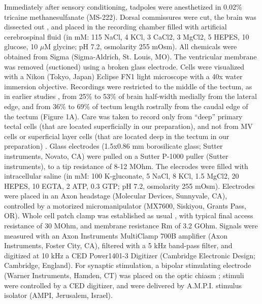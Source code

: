 \documentclass{article}
\begin{document}
Immediately after sensory conditioning, tadpoles were anesthetized in 0.02\% tricaine methanesulfanate (MS-222). Dorsal commissures were cut, the brain was dissected out \citep{aizenman2003,ciarleglio2015}, and placed in the recording chamber filled with artificial cerebrospinal fluid (in mM: 115 NaCl, 4 KCl, 3 CaCl2, 3 MgCl2, 5 HEPES, 10 glucose, 10 $\mu$M glycine; pH 7.2, osmolarity 255 mOsm). All chemicals were obtained from Sigma (Sigma-Aldrich, St. Louis, MO). The ventricular membrane was removed (suctioned) using a broken glass electrode. Cells were visualized with a Nikon (Tokyo, Japan) Eclipse FN1 light microscope with a 40x water immersion objective. Recordings were restricted to the middle of the tectum, as in earlier studies \citep{ciarleglio2015}, from 25\% to 53\% of brain half-width medially from the lateral edge, and from 36\% to 69\% of tectum length rostrally from the caudal edge of the tectum (Figure 1A). Care was taken to record only from “deep” primary tectal cells (that are located superficially in our preparation), and not from MV cells \citep{pratt2009trigeminal} or superficial layer cells (that are located deep in the tectum in our preparation) \citep{liu2016}. Glass electrodes (1.5x0.86 mm borosilicate glass; Sutter instruments, Novato, CA) were pulled on a Sutter P-1000 puller (Sutter instruments), to a tip resistance of 8-12 MOhm. The elecrodes were filled with intracellular saline (in mM: 100 K-gluconate, 5 NaCl, 8 KCl, 1.5 MgCl2, 20 HEPES, 10 EGTA, 2 ATP, 0.3 GTP; pH 7.2, osmolarity 255 mOsm). Electrodes were placed in an Axon headstage (Molecular Devices, Sunnyvale, CA), controlled by a motorized micromanipulator (MX7600, Siskiyou, Grants Pass, OR). Whole cell patch clamp was established as usual \citep{ciarleglio2015}, with typical final access resistance of 30 MOhm, and membrane resistance Rm of 3.2 GOhm. Signals were measured with an Axon Instruments MultiClamp 700B amplifier (Axon Instruments, Foster City, CA), filtered with a 5 kHz band-pass filter, and digitized at 10 kHz a CED Power1401-3 Digitizer (Cambridge Electronic Design; Cambridge, England). For synaptic stimulation, a bipolar stimulating electrode (Warner Instruments, Hamden, CT) was placed on the optic chiasm \citep{wu1996}; stimuli were controlled by a CED digitizer, and were delivered by A.M.P.I. stimulus isolator (AMPI, Jerusalem, Israel).
\end{document}
